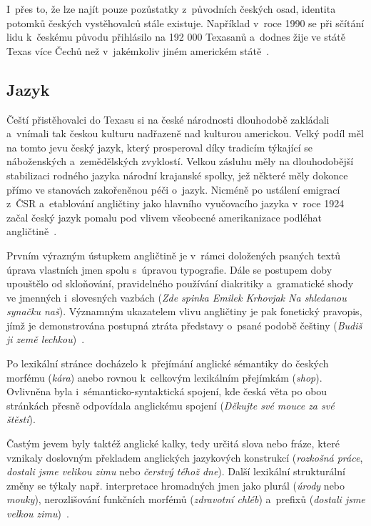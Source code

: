 I~přes to, že lze najít pouze pozůstatky z~původních českých osad, identita potomků českých vystěhovalců stále existuje. Například v~roce 1990 se při sčítání lidu k~českému původu přihlásilo na 192 000 Texasanů a~dodnes žije ve státě Texas více Čechů než v~jakémkoliv jiném americkém státě~\parencite{Eckertova2004}.

\hypertarget{jazyk-2}{%
\subsection*{Jazyk}\label{jazyk-2}}

Čeští přistěhovalci do Texasu si na české národnosti dlouhodobě zakládali a~vnímali tak českou kulturu nadřazeně nad kulturou americkou. Velký podíl měl na tomto jevu český jazyk, který prosperoval díky tradicím týkající se náboženských a~zemědělských zvyklostí. Velkou zásluhu měly na dlouhodobější stabilizaci rodného jazyka národní krajanské spolky, jež některé měly dokonce přímo ve stanovách zakořeněnou péči o~jazyk. Nicméně po ustálení emigrací z~ČSR a~etablování angličtiny jako hlavního vyučovacího jazyka v~roce 1924 začal český jazyk pomalu pod vlivem všeobecné amerikanizace podléhat angličtině~\parencite{amerika2017}.

Prvním výrazným ústupkem angličtině je v~rámci doložených psaných textů úprava vlastních jmen spolu s~úpravou typografie. Dále se postupem doby upouštělo od skloňování, pravidelného používání diakritiky a~gramatické shody ve jmenných i~slovesných vazbách (\emph{Zde spinka Emilek Krhovjak Na shledanou synačku naš}). Významným ukazatelem vlivu angličtiny je pak fonetický pravopis, jímž je demonstrována postupná ztráta představy o~psané podobě češtiny (\emph{Budiš ji země lechkou})~\parencite{Eckertová97}.

Po lexikální stránce docházelo k~přejímání anglické sémantiky do českých morfému (\emph{kára}) anebo rovnou k~celkovým lexikálním přejímkám (\emph{shop}). Ovlivněna byla i~sémanticko-syntaktická spojení, kde česká věta po obou stránkách přesně odpovídala anglickému spojení (\emph{Děkujte své mouce za své štěstí}).

Častým jevem byly taktéž anglické kalky, tedy určitá slova nebo fráze, které vznikaly doslovným překladem anglických jazykových konstrukcí (\emph{rozkošná práce}, \emph{dostali jsme velikou zimu} nebo \emph{čerstvý téhož dne}). Další lexikální strukturální změny se týkaly např. interpretace hromadných jmen jako plurál (\emph{úrody} nebo \emph{mouky}), nerozlišování funkčních morfémů (\emph{zdravotní chléb}) a~prefixů (\emph{dostali jsme velkou zimu})~\parencite{amerika2017}.

